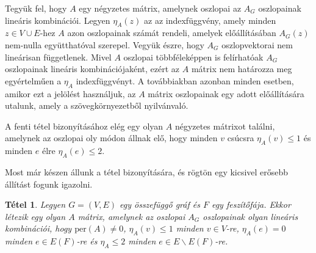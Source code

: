 \documentclass[12pt, a4paper]{report}
\newtheorem{tét}{Tétel}[section]
\theoremstyle{remark}
\theoremstyle{definition}
\begin{document}
Tegyük fel, hogy $A$ egy négyzetes mátrix, amelynek oszlopai az $A_G$ oszlopainak lineáris kombinációi. Legyen $\eta_A(z)$ az az indexfüggvény, amely minden $z \in V \cup E$-hez $A$ azon oszlopainak számát rendeli, amelyek előállításában $A_G(z)$ nem-nulla együtthatóval szerepel. Vegyük észre, hogy $A_G$ oszlopvektorai nem lineárisan függetlenek. Mivel $A$ oszlopai többféleképpen is felírhatóak $A_G$ oszlopainak lineáris kombinációjaként, ezért az $A$ mátrix nem határozza meg egyértelműen a $\eta_A$ indexfüggvényt. A továbbiakban azonban minden esetben, amikor ezt a jelölést használjuk, az $A$ mátrix oszlopainak egy adott előállítására utalunk, amely a szövegkörnyezetből nyilvánvaló.

A fenti tétel bizonyításához elég egy olyan $A$ négyzetes mátrixot találni, amelynek az oszlopai oly módon állnak elő, hogy minden $v$ csúcsra $\eta_A(v) \leq 1$ és minden $e$ élre $\eta_A(e) \leq 2$.

Most már készen állunk a tétel bizonyítására, és rögtön egy kicsivel erősebb állítást fogunk igazolni. 

\begin{tét}
Legyen $G = (V, E)$ egy összefüggő gráf és $F$ egy feszítőfája. Ekkor létezik egy olyan $A$ mátrix, amelynek az oszlopai $A_G$ oszlopainak olyan lineáris kombinációi, hogy $\mathrm{per}(A) \neq 0$, $\eta_A(v) \leq 1$ minden $v \in V$-re, $\eta_A(e) = 0$ minden $e \in E(F)$-re és $\eta_A \leq 2$ minden $e \in E \smallsetminus E(F)$-re.
\end{tét}
\end{document}

